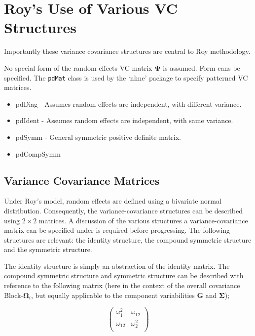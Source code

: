 \documentclass[12pt, a4paper]{report}
\theoremstyle{plain}
\theoremstyle{definition}
\theoremstyle{remark}
\begin{document}


	\section{Roy's Use of Various VC Structures}
		Importantly these variance covariance structures are central to Roy methodology.


		No special form of the random effects VC matrix $\boldsymbol{\Psi}$ is assumed.
		Form cans be specified.
		The \texttt{pdMat} class is used by the `nlme' package to specify patterned VC matrices.
		\begin{itemize}
			\item pdDiag - Assumes random effects are independent, with different variance.
			\item pdIdent - Assumes random effects are independent, with same variance.
			\item pdSymm - General symmetric positive definite matrix.
			\item pdCompSymm
		\end{itemize}
	\newpage
	\subsection{Variance Covariance Matrices }
	
	Under Roy's model, random effects are defined using a bivariate normal distribution. Consequently, the variance-covariance structures can be described using $2 \times 2$  matrices. A discussion of the various structures a variance-covariance matrix can be specified under is required before progressing. The following structures are relevant: the identity structure, the compound symmetric structure and the symmetric structure.
	
	The identity structure is simply an abstraction of the identity matrix. The compound symmetric structure and symmetric structure can be described with reference to the following matrix (here in the context of the overall covariance Block-$\boldsymbol{\Omega}_i$, but equally applicable to the component variabilities $\boldsymbol{G}$ and $\boldsymbol{\Sigma}$);
	
	\[\left( \begin{array}{cc}
	\omega^2_1  & \omega_{12} \\
	\omega_{12} & \omega^2_2 \\
	\end{array}\right) \]
	
\end{document}
